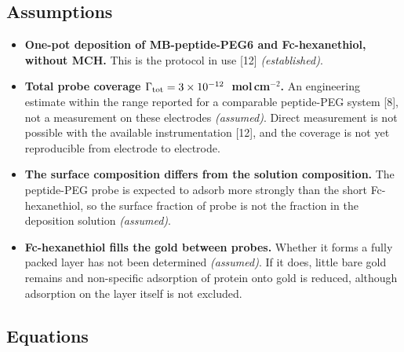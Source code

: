 \documentclass[10pt,a4paper]{article}
\numberwithin{equation}{section}
\newcommand{\cit}[1]{[#1]}
\newcommand{\Grtot}{\Gamma_{\rm tot}}
\newcommand{\FLAG}{\textit{(assumed)}}
\newcommand{\CONF}{\textit{(established)}}
\newenvironment{assump}{\small}{\smallskip}
\begin{document}
\subsection{Assumptions}

\begin{assump}
\begin{itemize}[leftmargin=*]
\item \textbf{One-pot deposition of MB-peptide-PEG6 and Fc-hexanethiol, without MCH.}
  This is the protocol in use \cit{12} \CONF.
\item \textbf{Total probe coverage $\Grtot = 3\times10^{-12}$~mol\,cm$^{-2}$.}
  An engineering estimate within the range reported for a comparable
  peptide-PEG system \cit{8}, not a measurement on these electrodes \FLAG. Direct
  measurement is not possible with the available instrumentation \cit{12}, and
  the coverage is not yet reproducible from electrode to electrode.
\item \textbf{The surface composition differs from the solution composition.} The
  peptide-PEG probe is expected to adsorb more strongly than the short
  Fc-hexanethiol, so the surface fraction of probe is not the fraction in the
  deposition solution \FLAG.
\item \textbf{Fc-hexanethiol fills the gold between probes.} Whether it forms a
  fully packed layer has not been determined \FLAG. If it does, little bare gold remains
  and non-specific adsorption of protein onto gold is reduced, although adsorption on the
  layer itself is not excluded.
\end{itemize}
\end{assump}

\subsection{Equations}
\end{document}
